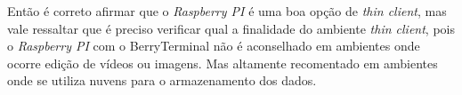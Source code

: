 \documentclass[
	12pt,				%
	openright,			%
	twoside,			%
	a4paper,			%
	chapter=TITLE,		%
	english,			%
	brazil				%
	]{abntex2}
\begin{document}
Então é correto afirmar que o \textit{Raspberry PI} é uma boa opção de \textit{thin client}, mas vale ressaltar que é preciso verificar qual a finalidade do ambiente \textit{thin client}, pois o \textit{Raspberry PI} com o BerryTerminal não é aconselhado em ambientes onde ocorre edição de vídeos ou imagens. Mas altamente recomentado em ambientes onde se utiliza nuvens para o armazenamento dos dados.








\postextual







\end{document}
